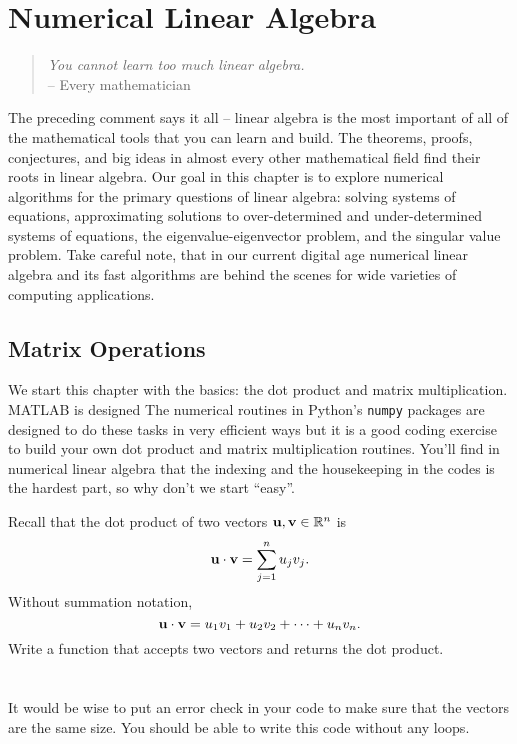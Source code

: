\chapter{Numerical Linear Algebra}\label{ch:linear_algebra}
\begin{quote}
    {\it You cannot learn too much
    linear algebra.} \\ -- Every mathematician
\end{quote}

The preceding comment says it all -- linear algebra is the most important of all of the
mathematical tools that you can learn and build.  The theorems, proofs, conjectures, and
big ideas in almost every other mathematical field find their roots in linear algebra.
Our goal in this chapter is to explore numerical algorithms for the primary questions of
linear algebra: solving systems of equations, approximating solutions to over-determined
and under-determined systems of equations, the eigenvalue-eigenvector problem, and the
singular value problem. Take careful note, that in our current digital age numerical
linear algebra and its fast algorithms are behind the scenes for wide varieties of
computing applications. 


\section{Matrix Operations}
We start this chapter with the basics: the dot product and matrix multiplication.  
\ifnum{} 
MATLAB is designed 
\else
The numerical routines in Python's \texttt{numpy} packages are designed 
\fi
to do these tasks in very efficient ways but it is a good coding exercise to build your
own dot product and matrix multiplication routines.  You'll find in numerical linear
algebra that the indexing and the housekeeping in the codes is the hardest part, so why
don't we start ``easy''.

\begin{problem}
    Recall that the dot product of two vectors ${\bf u}, {\bf v} \in \mathbb{R}^n$ is 
    \[ {\bf u} \cdot {\bf v} = \sum_{j=1}^n u_j v_j. \]
    Without summation notation,
    \[ {\bf u} \cdot {\bf v} = u_1 v_1 + u_2 v_2 + \cdots + u_n v_n. \]
    Write a \ProgLang function that accepts two vectors and returns the dot product. \\
    \ifnum{}
     \\
    \else
     \\
    \fi
    It would be wise to put an error check in your code to make sure that the vectors are
    the same size.  You should be able to write this code without any loops.
\end{problem}

